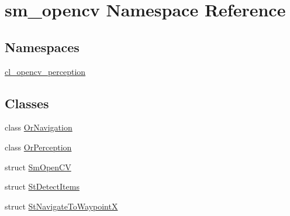 \hypertarget{namespacesm__opencv}{}\section{sm\+\_\+opencv Namespace Reference}
\label{namespacesm__opencv}
\subsection*{Namespaces}
\begin{DoxyCompactItemize}
\item 
 \hyperlink{namespacesm__opencv_1_1cl__opencv__perception}{cl\+\_\+opencv\+\_\+perception}
\end{DoxyCompactItemize}
\subsection*{Classes}
\begin{DoxyCompactItemize}
\item 
class \hyperlink{classsm__opencv_1_1OrNavigation}{Or\+Navigation}
\item 
class \hyperlink{classsm__opencv_1_1OrPerception}{Or\+Perception}
\item 
struct \hyperlink{structsm__opencv_1_1SmOpenCV}{Sm\+Open\+CV}
\item 
struct \hyperlink{structsm__opencv_1_1StDetectItems}{St\+Detect\+Items}
\item 
struct \hyperlink{structsm__opencv_1_1StNavigateToWaypointX}{St\+Navigate\+To\+WaypointX}
\end{DoxyCompactItemize}
